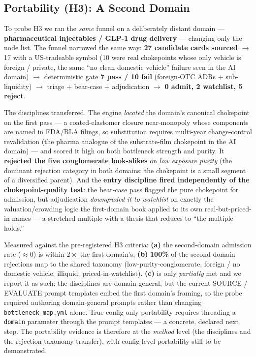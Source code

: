\documentclass[11pt]{article}
\begin{document}
\subsection{Portability (H3): A Second Domain}

To probe H3 we ran the \emph{same} funnel on a deliberately distant domain ---
\textbf{pharmaceutical injectables / GLP-1 drug delivery} --- changing only the
node list. The funnel narrowed the same way: \textbf{27 candidate cards sourced}
$\to$ 17 with a US-tradeable symbol (10 were real chokepoints whose only vehicle
is foreign / private, the same ``no clean domestic vehicle'' failure seen in the
AI domain) $\to$ deterministic gate \textbf{7 pass / 10 fail} (foreign-OTC ADRs +
sub-liquidity) $\to$ triage + bear-case + adjudication $\to$ \textbf{0 admit, 2
watchlist, 5 reject}.

The disciplines transferred. The engine \emph{located} the domain's canonical
chokepoint on the first pass --- a coated-elastomer closure near-monopoly whose
components are named in FDA/BLA filings, so substitution requires multi-year
change-control revalidation (the pharma analogue of the substrate-film chokepoint
in the AI domain) --- and scored it high on both bottleneck strength and purity.
It \textbf{rejected the five conglomerate look-alikes} on \emph{low exposure
purity} (the dominant rejection category in both domains; the chokepoint is a
small segment of a diversified parent). And the \textbf{entry discipline fired
independently of the chokepoint-quality test}: the bear-case pass flagged the pure
chokepoint for admission, but adjudication \emph{downgraded it to watchlist} on
exactly the valuation/crowding logic the first-domain book applied to its own
real-but-priced-in names --- a stretched multiple with a thesis that reduces to
``the multiple holds.''

Measured against the pre-registered H3 criteria: \textbf{(a)} the second-domain
admission rate ($\approx 0$) is within $2\times$ the first domain's; \textbf{(b)}
\textbf{100\%} of the second-domain rejections map to the shared taxonomy
(low-purity-conglomerate, foreign / no domestic vehicle, illiquid,
priced-in-watchlist). \textbf{(c)} is only \emph{partially} met and we report it
as such: the disciplines are domain-general, but the current SOURCE / EVALUATE
prompt templates embed the first domain's framing, so the probe required authoring
domain-general prompts rather than changing \texttt{bottleneck\_map.yml} alone.
True config-only portability requires threading a \texttt{domain} parameter through
the prompt templates --- a concrete, declared next step. The portability evidence
is therefore at the \emph{method} level (the disciplines and the rejection taxonomy
transfer), with config-level portability still to be demonstrated.
\end{document}
